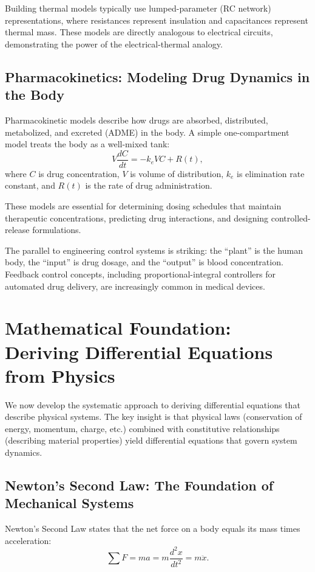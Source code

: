 Building thermal models typically use lumped-parameter (RC network) representations, where resistances represent insulation and capacitances represent thermal mass. These models are directly analogous to electrical circuits, demonstrating the power of the electrical-thermal analogy.

\subsection{Pharmacokinetics: Modeling Drug Dynamics in the Body}

Pharmacokinetic models describe how drugs are absorbed, distributed, metabolized, and excreted (ADME) in the body. A simple one-compartment model treats the body as a well-mixed tank:
\begin{equation}
V\frac{dC}{dt} = -k_e V C + R(t),
\end{equation}
where $C$ is drug concentration, $V$ is volume of distribution, $k_e$ is elimination rate constant, and $R(t)$ is the rate of drug administration.

These models are essential for determining dosing schedules that maintain therapeutic concentrations, predicting drug interactions, and designing controlled-release formulations.

The parallel to engineering control systems is striking: the ``plant'' is the human body, the ``input'' is drug dosage, and the ``output'' is blood concentration. Feedback control concepts, including proportional-integral controllers for automated drug delivery, are increasingly common in medical devices.


\section{Mathematical Foundation: Deriving Differential Equations from Physics}

We now develop the systematic approach to deriving differential equations that describe physical systems. The key insight is that physical laws (conservation of energy, momentum, charge, etc.) combined with constitutive relationships (describing material properties) yield differential equations that govern system dynamics.

\subsection{Newton's Second Law: The Foundation of Mechanical Systems}

Newton's Second Law states that the net force on a body equals its mass times acceleration:
\begin{equation}
\sum F = ma = m\frac{d^2x}{dt^2} = m\ddot{x}.
\label{eq:newton_basic}
\end{equation}

